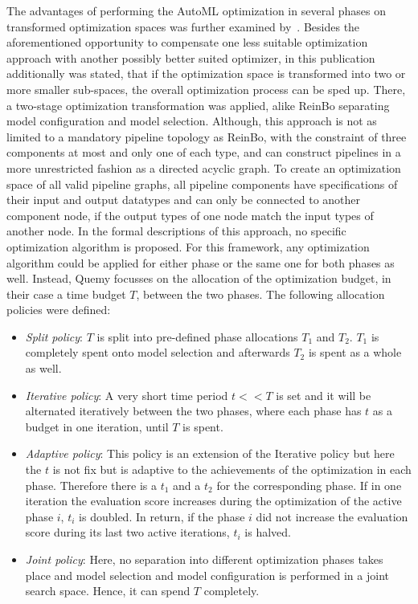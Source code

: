 The advantages of performing the AutoML optimization in several phases on transformed optimization spaces was further examined by~\textcite{Quemy-Two-Stage-Optimization}.
Besides the aforementioned opportunity to compensate one less suitable optimization approach with another possibly better suited optimizer, in this publication additionally was stated, that if the optimization space is transformed into two or more smaller sub-spaces, the overall optimization process can be sped up.
There, a two-stage optimization transformation was applied, alike ReinBo separating model configuration and model selection.
Although, this approach is not as limited to a mandatory pipeline topology as ReinBo, with the constraint of three components at most and only one of each type, and can construct pipelines in a more unrestricted fashion as a directed acyclic graph.
To create an optimization space of all valid pipeline graphs, all pipeline components have specifications of their input and output datatypes and can only be connected to another component node, if the output types of one node match the input types of another node.\newline
In the formal descriptions of this approach, no specific optimization algorithm is proposed.
For this framework, any optimization algorithm could be applied for either phase or the same one for both phases as well.
Instead, Quemy focusses on the allocation of the optimization budget, in their case a time budget $T$, between the two phases.
The following allocation policies were defined:
\begin{itemize}
    \item \textit{Split policy}: $T$ is split into pre-defined phase allocations $T_1$ and $T_2$. $T_1$ is completely spent onto model selection and afterwards $T_2$ is spent as a whole as well.
    \item \textit{Iterative policy}: A very short time period $t << T$ is set and it will be alternated iteratively between the two phases, where each phase has $t$ as a budget in one iteration, until $T$ is spent.
    \item \textit{Adaptive policy}: This policy is an extension of the Iterative policy but here the $t$ is not fix but is adaptive to the achievements of the optimization in each phase.
    Therefore there is a $t_1$ and a $t_2$ for the corresponding phase.
    If in one iteration the evaluation score increases during the optimization of the active phase $i$, $t_i$ is doubled.
    In return, if the phase $i$ did not increase the evaluation score during its last two active iterations, $t_i$ is halved.
    \item \textit{Joint policy}: Here, no separation into different optimization phases takes place and model selection and model configuration is performed in a joint search space.
    Hence, it can spend $T$ completely.
\end{itemize}

